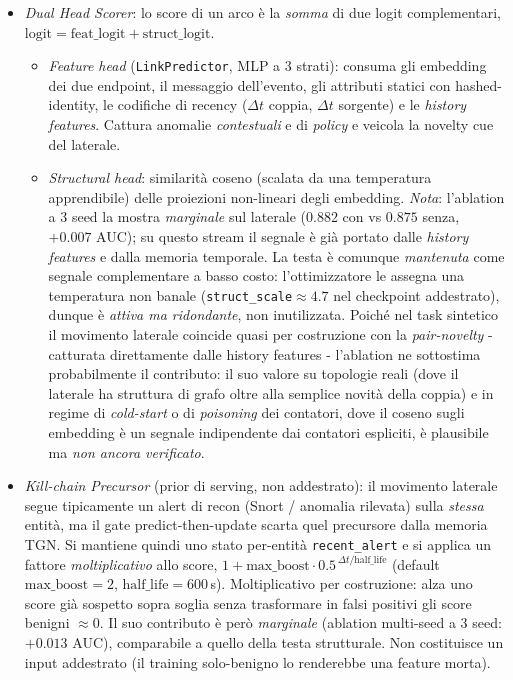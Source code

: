 \documentclass[11pt,a4paper]{report}
\begin{document}
\begin{itemize}
    \item \textit{Dual Head Scorer}: lo score di un arco è la \emph{somma} di due logit complementari, $\text{logit} = \text{feat\_logit} + \text{struct\_logit}$.
    \begin{itemize}
        \item \textit{Feature head} (\texttt{LinkPredictor}, MLP a 3 strati): consuma gli embedding dei due endpoint, il messaggio dell'evento, gli attributi statici con hashed-identity, le codifiche di recency ($\Delta t$ coppia, $\Delta t$ sorgente) e le \textit{history features}. Cattura anomalie \textit{contestuali} e di \textit{policy} e veicola la novelty cue del laterale.
        \item \textit{Structural head}: similarità coseno (scalata da una temperatura apprendibile) delle proiezioni non-lineari degli embedding. \emph{Nota}: l'ablation a 3 seed la mostra \emph{marginale} sul laterale ($0.882$ con vs $0.875$ senza, $+0.007$ AUC); su questo stream il segnale è già portato dalle \textit{history features} e dalla memoria temporale. La testa è comunque \emph{mantenuta} come segnale complementare a basso costo: l'ottimizzatore le assegna una temperatura non banale (\texttt{struct\_scale}$\approx 4.7$ nel checkpoint addestrato), dunque è \emph{attiva ma ridondante}, non inutilizzata. Poiché nel task sintetico il movimento laterale coincide quasi per costruzione con la \textit{pair-novelty} - catturata direttamente dalle history features - l'ablation ne sottostima probabilmente il contributo: il suo valore su topologie reali (dove il laterale ha struttura di grafo oltre alla semplice novità della coppia) e in regime di \textit{cold-start} o di \textit{poisoning} dei contatori, dove il coseno sugli embedding è un segnale indipendente dai contatori espliciti, è plausibile ma \emph{non ancora verificato}.
    \end{itemize}
    \item \textit{Kill-chain Precursor} (prior di serving, non addestrato): il movimento laterale segue tipicamente un alert di recon (Snort / anomalia rilevata) sulla \emph{stessa} entità, ma il gate predict-then-update scarta quel precursore dalla memoria TGN. Si mantiene quindi uno stato per-entità \texttt{recent\_alert} e si applica un fattore \emph{moltiplicativo} allo score, $1 + \text{max\_boost}\cdot 0.5^{\,\Delta t / \text{half\_life}}$ (default $\text{max\_boost}{=}2$, $\text{half\_life}{=}600$\,s). Moltiplicativo per costruzione: alza uno score già sospetto sopra soglia senza trasformare in falsi positivi gli score benigni $\approx 0$. Il suo contributo è però \emph{marginale} (ablation multi-seed a 3 seed: $+0.013$ AUC), comparabile a quello della testa strutturale. Non costituisce un input addestrato (il training solo-benigno lo renderebbe una feature morta).
\end{itemize}
\end{document}
